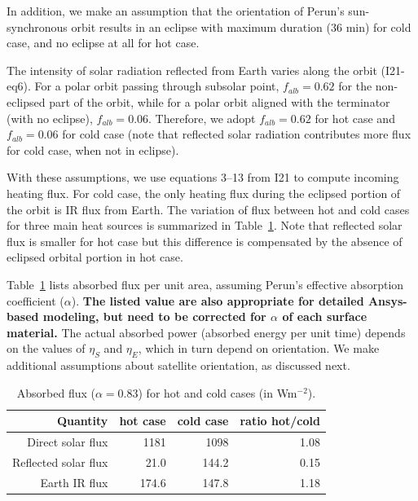 \documentclass[]{aastex62}
\begin{document}
In addition, we make an assumption that the orientation of Perun's sun-synchronous orbit
results in an eclipse with maximum duration (36 min) for cold case, and no eclipse at all for 
hot case. 

The intensity of solar radiation reflected from Earth varies along the orbit (I21-eq6). For a polar 
orbit passing through subsolar point, $f_{alb}=0.62$ for the non-eclipsed part of the orbit, while 
for a polar orbit aligned with the terminator (with no eclipse), $f_{alb}=0.06$. Therefore, 
we adopt $f_{alb}=0.62$ for hot case and $f_{alb}=0.06$ for cold case (note that reflected solar 
radiation contributes more flux for cold case, when not in eclipse). 
 
With these assumptions, we use equations 3--13 from I21 to compute incoming heating flux.
For cold case, the only heating flux during the eclipsed portion of the orbit is IR flux from Earth. 
The variation of flux between hot and cold cases for three main heat sources is summarized in 
Table~\ref{tab:inputflux}. Note that reflected solar flux is smaller for hot case but this difference
is compensated by the absence of eclipsed orbital portion in hot case. 

Table~\ref{tab:inputflux} lists absorbed flux per unit area, assuming Perun's effective 
absorption coefficient ($\alpha$). {\bf The listed value are also appropriate for detailed 
Ansys-based modeling, but need to be corrected for $\alpha$ of each surface material.} 
The actual absorbed power (absorbed energy per unit time) depends on 
the values of $\eta_S$ and $\eta_E$, which in turn depend on orientation. We make additional 
assumptions about satellite orientation, as discussed next. 

\begin{table}[t]
	\centering
	\caption{Absorbed flux ($\alpha=0.83$) for hot and cold cases (in  Wm$^{-2}$). }
	\label{tab:inputflux}
	\begin{tabular}{r|r|r|r} %
		\hline
  	                    Quantity  & hot case   &   cold  case &   ratio hot/cold    \\
		\hline
              Direct solar flux    &    1181        &     1098         &     1.08       \\
           Reflected solar flux  &     21.0        &     144.2        &     0.15     \\    
                       Earth IR flux  &   174.6       &     147.8        &     1.18      \\
		\hline
	\end{tabular} 
\end{table}
\end{document}
